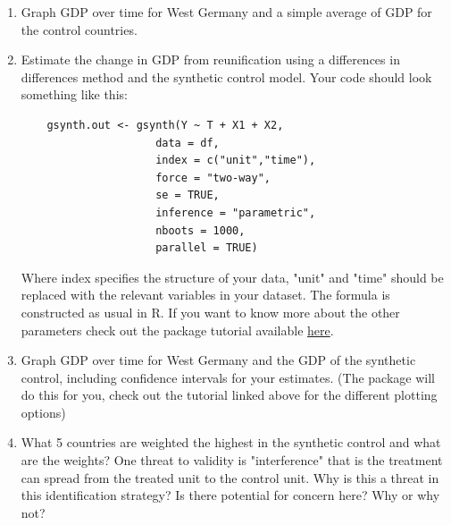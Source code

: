 \documentclass[11pt]{article}
\begin{document}
\begin{enumerate}[label=\alph*)]
    \item Graph GDP over time for West Germany and a simple average of GDP for the control countries.
    \item Estimate the change in GDP from reunification using a differences in differences method and the synthetic control model. Your code should look something like this:
    \begin{verbatim}
    gsynth.out <- gsynth(Y ~ T + X1 + X2, 
                     data = df,
                     index = c("unit","time"), 
                     force = "two-way", 
                     se = TRUE, 
                     inference = "parametric",
                     nboots = 1000,
                     parallel = TRUE)
    \end{verbatim}
    Where index specifies the structure of your data,  "unit" and "time" should be replaced with the relevant variables in your dataset. The formula is constructed as usual in R. If you want to know more about the other parameters check out the package tutorial available \href{https://yiqingxu.org/packages/gsynth/articles/tutorial.html}{here}.
    \item Graph GDP over time for West Germany and the GDP of the synthetic control, including confidence intervals for your estimates. (The package will do this for you, check out the tutorial linked above for the different plotting options)
    \item What 5 countries are weighted the highest in the synthetic control and what are the weights? One threat to validity is "interference" that is the treatment can spread from the treated unit to the control unit. Why is this a threat in this identification strategy? Is there potential for concern here? Why or why not?
\end{enumerate}
\end{document}
